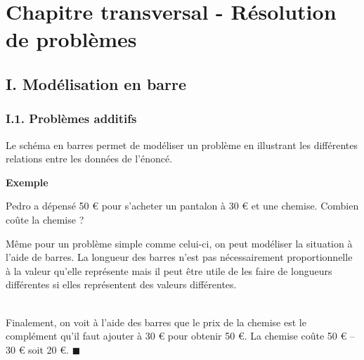 \documentclass[a4paper,12pt,twoside]{article}
\numberwithin{dummy}{section}
\theoremstyle{ocrenumboxTh}
\theoremstyle{ocrenumboxExercice}
\theoremstyle{ocrenumboxExercice}
\theoremstyle{ocrenumboxEx}
\theoremstyle{ocrenumboxEx}
\theoremstyle{ocrenumboxTh}
\theoremstyle{ocrenumboxTh*}
\theoremstyle{ocrenumboxTh}
\theoremstyle{ocrenumboxTh*}
\theoremstyle{ocrenumboxCoro}
\theoremstyle{ocrenumboxCoro*}
\theoremstyle{ocrenumboxCoro}
\theoremstyle{ocrenumboxCoro*}
\theoremstyle{ocrenumboxProp}
\theoremstyle{ocrenumboxProp*}
\theoremstyle{ocrenumboxProp}
\theoremstyle{ocrenumboxProp*}
\theoremstyle{ocrenumboxMéthode}
\theoremstyle{ocrenumboxMéthode}
\theoremstyle{ocrenumboxDef}
\theoremstyle{ocrenumboxDef*}
\theoremstyle{ocrenumboxDef}
\theoremstyle{ocrenumboxDef*}
\theoremstyle{ocrenumboxReg}
\theoremstyle{ocrenumboxReg*}
\theoremstyle{ocrenumboxReg}
\theoremstyle{ocrenumboxReg*}
\theoremstyle{ocrenumboxVoc}
\theoremstyle{ocrenumboxVoc}
\theoremstyle{ocrenumboxNot}
\theoremstyle{ocrenumboxNot}
\theoremstyle{ocrenumboxNot*}
\theoremstyle{ocrenumboxNot*}
\theoremstyle{ocrenum}
\newenvironment{Exemple}
  {%
   \par\vspace{2pt}%
   {\sffamily\bfseries\color{Couleur8} Exemple} %
   \par\vspace{0pt}%
   \begin{exBox}%
  }
  {\hfill{\color{Couleur8}\tiny\ensuremath{\blacksquare}}\end{exBox}}
\begin{document}
\setcounter{page}{40}

\section*{Chapitre transversal - Résolution de problèmes}

\subsection*{I. Modélisation en barre}

\subsubsection*{I.1. Problèmes additifs}
Le schéma en barres permet de modéliser un problème en illustrant les différentes relations entre les données de l'énoncé.


\begin{Exemple}
Pedro a dépensé 50 € pour s'acheter un pantalon à 30 € et une chemise. Combien coûte la chemise ?

\vspace{0.5cm}
\begin{minipage}[c]{0.55\textwidth}
Même pour un problème simple comme celui-ci, on peut modéliser la situation à l'aide de barres. La longueur des barres n'est pas nécessairement proportionnelle à la valeur qu'elle représente mais il peut être utile de les faire de longueurs différentes si elles représentent des valeurs différentes. 

\end{minipage} 
 \begin{minipage}[c]{0.45\textwidth}



\begin{center}
\end{center}
\end{minipage}
$ $\\
Finalement, on voit à l'aide des barres que le prix de la chemise est le complément qu'il faut ajouter à 30 € pour obtenir 50 €. La chemise coûte 50 € – 30 € soit 20 €.
\end{Exemple}
\end{document}
